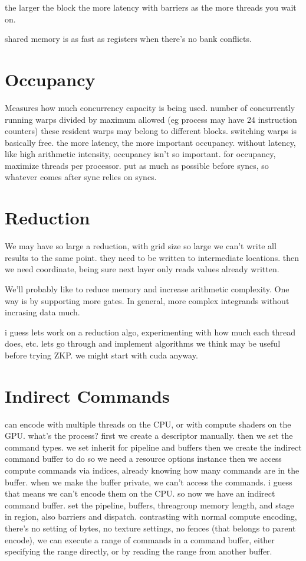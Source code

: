 the larger the block the more latency with barriers as the more threads you wait on. 

shared memory is as fast as registers when there's no bank conflicts. 

\section{Occupancy}
Measures how much concurrency capacity is being used.
number of concurrently running warps divided by maximum allowed (eg process may have 24 instruction counters)
these resident warps may belong to different blocks. 
switching warps is basically free. 
the more latency, the more important occupancy. without latency, like high arithmetic intensity, occupancy isn't so important. 
for occupancy, maximize threads per processor. 
put as much as possible before syncs, so whatever comes after sync relies on syncs. 



\section{Reduction}

We may have so large a reduction, with grid size so large we can't write all results to the same point. they need to be written to intermediate locations.
then we need coordinate, being sure next layer only reads values already written.


We'll probably like to reduce memory and increase arithmetic complexity.
One way is by supporting more gates. In general, more complex integrands without incrasing data much.

i guess lets work on a reduction algo, experimenting with how much each thread does, etc. 
lets go through and implement algorithms we think may be useful before trying ZKP. 
we might start with cuda anyway. 



\section{Indirect Commands}

can encode with multiple threads on the CPU, or with compute shaders on the GPU.
what's the process?
first we create a descriptor manually. 
    then we set the command types.
    we set inherit for pipeline and buffers
then we create the indirect command buffer
    to do so we need a resource options instance
then we access compute commands via indices, already knowing how many commands are in the buffer.
when we make the buffer private, we can't access the commands. i guess that means we can't encode them on the CPU.
so now we have an indirect command buffer.
set the pipeline, buffers, threagroup memory length, and stage in region, also barriers and dispatch. contrasting with normal compute encoding, there's no setting of bytes, no texture settings, no fences (that belongs to parent encode), 
we can execute a range of commands in a command buffer, either specifying the range directly, or by reading the range from another buffer.

